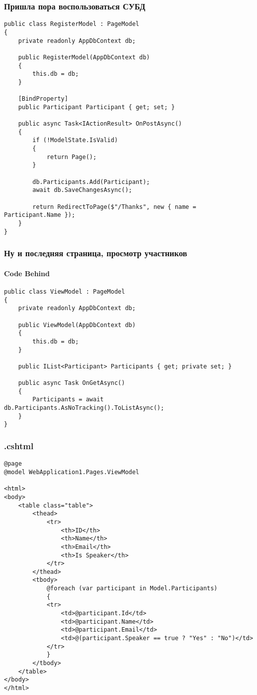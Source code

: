 \documentclass[xetex,mathserif,serif]{beamer}
\begin{document}
	\begin{frame}[fragile]
		\frametitle{Пришла пора воспользоваться СУБД}
		\begin{ssmall}
			\begin{verbatim}
public class RegisterModel : PageModel
{
    private readonly AppDbContext db;

    public RegisterModel(AppDbContext db)
    {
        this.db = db;
    }

    [BindProperty]
    public Participant Participant { get; set; }

    public async Task<IActionResult> OnPostAsync()
    {
        if (!ModelState.IsValid)
        {
            return Page();
        }

        db.Participants.Add(Participant);
        await db.SaveChangesAsync();

        return RedirectToPage($"/Thanks", new { name = Participant.Name });
    }
}
			\end{verbatim}
		\end{ssmall}
	\end{frame}

	\begin{frame}[fragile]
		\frametitle{Ну и последняя страница, просмотр участников}
		\framesubtitle{Code Behind}
		\begin{scriptsize}
			\begin{verbatim}
public class ViewModel : PageModel
{
    private readonly AppDbContext db;

    public ViewModel(AppDbContext db)
    {
        this.db = db;
    }

    public IList<Participant> Participants { get; private set; }

    public async Task OnGetAsync()
    {
        Participants = await db.Participants.AsNoTracking().ToListAsync();
    }
}
			\end{verbatim}
		\end{scriptsize}
	\end{frame}

	\begin{frame}[fragile]
		\frametitle{.cshtml}
		\begin{ssmall}
			\begin{verbatim}
@page
@model WebApplication1.Pages.ViewModel

<html>
<body>
    <table class="table">
        <thead>
            <tr>
                <th>ID</th>
                <th>Name</th>
                <th>Email</th>
                <th>Is Speaker</th>
            </tr>
        </thead>
        <tbody>
            @foreach (var participant in Model.Participants)
            {
            <tr>
                <td>@participant.Id</td>
                <td>@participant.Name</td>
                <td>@participant.Email</td>
                <td>@(participant.Speaker == true ? "Yes" : "No")</td>
            </tr>
            }
        </tbody>
    </table>
</body>
</html>
			\end{verbatim}
		\end{ssmall}
	\end{frame}
\end{document}
